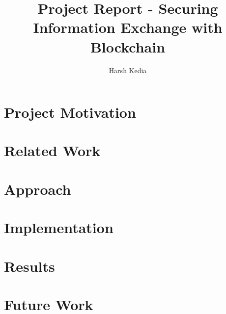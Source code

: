 \documentclass[]{report}
\title{Project Report - Securing Information Exchange with Blockchain}
\author{Harsh Kedia}
\begin{document}
	\maketitle

	\begin{abstract}
	\end{abstract}

	\section{Project Motivation}
	
	\section{Related Work}
	
	\section{Approach}
	
	\section{Implementation}
	
	\section{Results}
	
	\section{Future Work}
\end{document}
